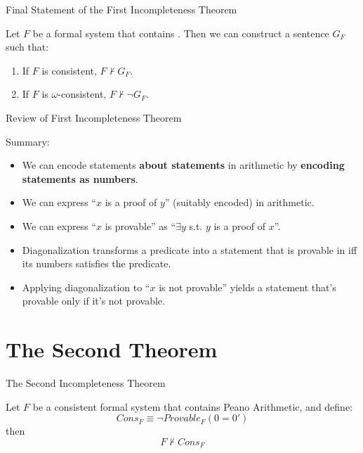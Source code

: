 \documentclass{beamer}
\begin{document}
\begin{frame}{Final Statement of the First Incompleteness Theorem}

  \begin{theorem}
    Let $F$ be a formal system that contains \robinson{}. Then we can construct
    a sentence $G_F$ such that:

    \begin{enumerate}
    \item If $F$ is consistent, $F \nvdash G_F$.
    \item If $F$ is $\omega$-consistent, $F \nvdash \neg G_F$.
    \end{enumerate}

  \end{theorem}

\end{frame}

\begin{frame}{Review of First Incompleteness Theorem}
  \begin{block}{Summary:}
    \begin{itemize}
    \item<1-> We can encode statements \textbf{about statements} in arithmetic
      by \textbf{encoding statements as numbers}.
    \item<2-> We can express ``$x$ is a proof of $y$'' (suitably encoded) in
      arithmetic.
    \item<3-> We can express ``$x$ is provable'' as ``$\exists y$ s.t. $y$ is a
      proof of $x$''.
    \item<4-> Diagonalization transforms a predicate into a statement that is
      provable in iff its \godel{} numbers satisfies the predicate.
    \item<5-> Applying diagonalization to ``$x$ is not provable'' yields a
      statement that's provable only if it's not provable.
    \end{itemize}
  \end{block}
\end{frame}

\section{The Second Theorem}

\begin{frame}{The Second Incompleteness Theorem}
  \begin{theorem}
    Let $F$ be a consistent formal system that contains Peano Arithmetic, and
    define:
    $$Cons_F \equiv \neg Provable_F(0 = 0')$$
    then
    $$F \nvdash Cons_F $$
  \end{theorem}


\end{frame}
\end{document}

